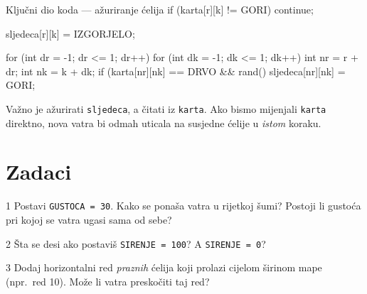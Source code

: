 \documentclass[11pt]{article}
\begin{document}
\begin{kodbox}{Ključni dio koda — ažuriranje ćelija}
if (karta[r][k] != GORI) continue;

sljedeca[r][k] = IZGORJELO;

for (int dr = -1; dr <= 1; dr++) {
    for (int dk = -1; dk <= 1; dk++) {
        int nr = r + dr;
        int nk = k + dk;
        if (karta[nr][nk] == DRVO && rand() %
            sljedeca[nr][nk] = GORI;
    }
}
\end{kodbox}

\begin{napomena}
    Važno je ažurirati \texttt{sljedeca}, a čitati iz \texttt{karta}.
    Ako bismo mijenjali \texttt{karta} direktno, nova vatra bi odmah
    uticala na susjedne ćelije u \emph{istom} koraku.
\end{napomena}

\section*{Zadaci}

\begin{zadatak}{1}
Postavi \texttt{GUSTOCA = 30}. Kako se ponaša vatra u rijetkoj šumi?
Postoji li gustoća pri kojoj se vatra ugasi sama od sebe?
\end{zadatak}

\begin{zadatak}{2}
Šta se desi ako postaviš \texttt{SIRENJE = 100}? A \texttt{SIRENJE = 0}?
\end{zadatak}

\begin{zadatak}{3}
Dodaj horizontalni red \emph{praznih} ćelija koji prolazi cijelom širinom
mape (npr.\ red 10). Može li vatra preskočiti taj red?
\end{zadatak}
\end{document}

